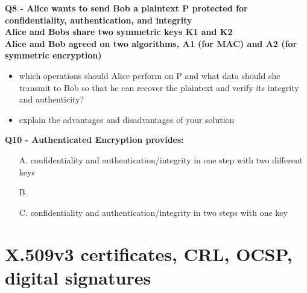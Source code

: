 \textbf{Q8 - Alice wants to send Bob a plaintext P protected for confidentiality, authentication, and integrity \\
Alice and Bobs share two symmetric keys K1 and K2 \\
Alice and Bob agreed on two algorithms, A1 (for MAC) and A2 (for symmetric encryption)}
\begin{itemize}
    \item which operations should Alice perform on P and what data
    should she transmit to Bob so that he can recover the plaintext
    and verify its integrity and authenticity?
    \item explain the advantages and disadvantages of your solution 
\end{itemize}
\textbf{Q10  - Authenticated Encryption provides:}
\begin{enumerate}
    \item[A.] confidentiality and authentication/integrity in one step with two different keys
    \item[B.] 
    \item[C.] confidentiality and authentication/integrity in two steps with one key
\end{enumerate}




\section{X.509v3 certificates, CRL, OCSP, digital signatures}

